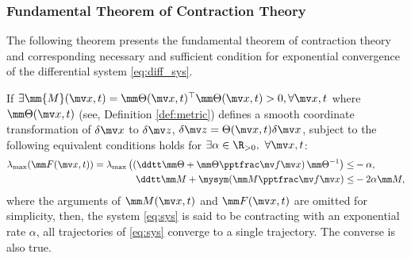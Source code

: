 \subsubsection{Fundamental Theorem of Contraction Theory}

The following theorem presents the fundamental theorem of contraction theory and corresponding necessary and sufficient condition for exponential convergence of the differential system \eqref{eq:diff_sys}.

\begin{theorem}
    If $
        \exists \mm{M}(\bdx,t)
        =
        \mm\Theta(\bdx,t)^\top
        \mm\Theta(\bdx,t)
        > 0, \forall \bdx,t
    $ where $\mm\Theta(\bdx,t)$ (see, Definition \ref{def:metric}) defines a smooth coordinate transformation of $\delta\bdx$ to $\delta\bdz$, \ie $\delta\bdz = \Theta(\bdx,t)\delta\bdx$, subject to the following equivalent conditions holds for $\exists\alpha\in\R_{>0},\ \forall \bdx,t$:
    \begin{subequations}
        \begin{align}
            \lambda_{\max} (
                \mm F(\bdx,t)
            )
            =
            \lambda_{\max} 
            \left(
                \left(    
                \ddtt \mm\Theta
                +
                \mm\Theta\tpfpx
                \right)
                \mm\Theta^{-1}
            \right)
            \le&
            -\alpha
            ,
        \label{eq:ctrac:metric:F}
            \\
            \ddtt \mm M
            +
            \mysym(\mm M\tpfpx)
            \le&
            -2\alpha\mm M
            ,
        \label{eq:ctrac:metric:M}
        \end{align}
        \label{eq:ctrac:metric}
    \end{subequations}
    where the arguments of $\mm M(\bdx,t)$ and $\mm F(\bdx,t)$ are omitted for simplicity, then, the system \eqref{eq:sys} is said to be contracting with an exponential rate $\alpha$, \ie all trajectories of \eqref{eq:sys} converge to a single trajectory.
    The converse is also true.
    \label{thm:ctrac:main}
\end{theorem}

